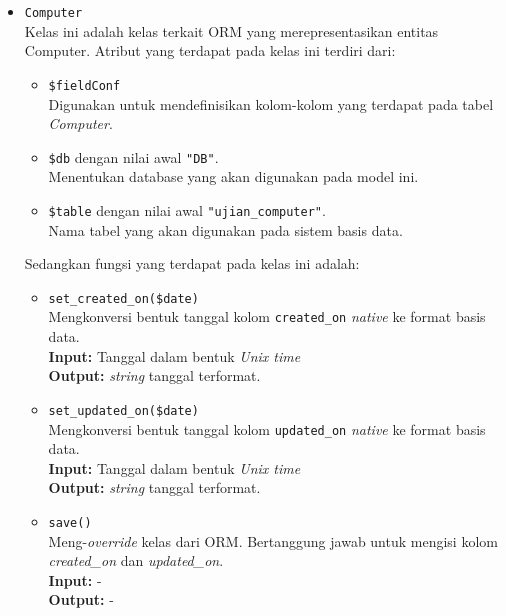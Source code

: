     \begin{itemize}
        \item \texttt{Computer} \\
            Kelas ini adalah kelas terkait ORM yang merepresentasikan entitas
            Computer. Atribut yang terdapat pada kelas ini terdiri dari:
            \begin{itemize}
                \item \texttt{\$fieldConf} \\
                    Digunakan untuk mendefinisikan kolom-kolom yang terdapat
                    pada tabel \textit{Computer}.
                \item \texttt{\$db} dengan nilai awal \texttt{"DB"}. \\
                    Menentukan database yang akan digunakan pada model ini.
                \item \texttt{\$table} dengan nilai awal
                \texttt{"ujian\_computer"}. \\
                    Nama tabel yang akan digunakan pada sistem basis data. 
            \end{itemize}
            Sedangkan fungsi yang terdapat pada kelas ini adalah:
            \begin{itemize}
                \item \texttt{set\_created\_on(\$date)} \\
                    Mengkonversi bentuk tanggal kolom \texttt{created\_on}
                    \textit{native} ke format basis data. \\
                    \textbf{Input:} Tanggal dalam bentuk \textit{Unix time}\\
                    \textbf{Output:} \textit{string} tanggal terformat.
                
                \item \texttt{set\_updated\_on(\$date)} \\
                    Mengkonversi bentuk tanggal kolom \texttt{updated\_on}
                    \textit{native} ke format basis data. \\
                    \textbf{Input:} Tanggal dalam bentuk \textit{Unix time}\\
                    \textbf{Output:} \textit{string} tanggal terformat.
                
                \item \texttt{save()}\\
                    Meng-\textit{override} kelas dari ORM. Bertanggung jawab
                    untuk mengisi kolom \textit{created\_on} dan
                    \textit{updated\_on}.\\
                    \textbf{Input:} -\\
                    \textbf{Output:} -
            \end{itemize}
            

\end{itemize}

